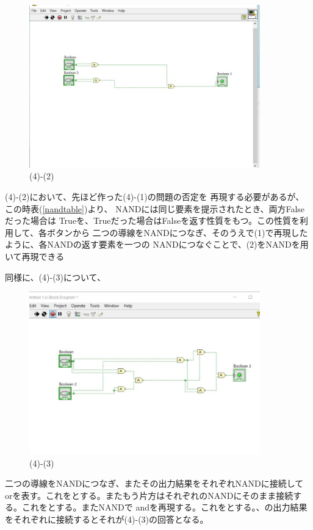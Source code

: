 \documentclass[a4paper,titlepage,11pt]{ltjsarticle}
\begin{document}
\begin{figure}[H]
  \begin{center}
    \includegraphics[width=100mm]{4-1b.pdf}
    \caption{(4)-(2)}
  \end{center}
\end{figure}

(4)-(2)において、先ほど作った(4)-(1)の問題の否定を
再現する必要があるが、この時表(\ref{nandtable})より、
NANDには同じ要素を提示されたとき、両方Falseだった場合は
Trueを、Trueだった場合はFalseを返す性質をもつ。この性質を利用して、各ボタンから
二つの導線をNANDにつなぎ、そのうえで(1)で再現したように、各NANDの返す要素を一つの
NANDにつなぐことで、(2)をNANDを用いて再現できる

同様に、(4)-(3)について、

\begin{figure}[H]
  \begin{center}
    \includegraphics[width=100mm]{4-3b.pdf}
    \caption{(4)-(3)}
  \end{center}
\end{figure}

二つの導線をNANDにつなぎ、またその出力結果をそれぞれNANDに接続して
orを表す。これを\alpha とする。またもう片方はそれぞれのNANDにそのまま接続する。これを\beta とする。またNANDで
andを再現する。これを\gamma とする。\alpha 、\beta の出力結果をそれぞれ\gamma に接続するとそれが(4)-(3)の回答となる。
\end{document}
